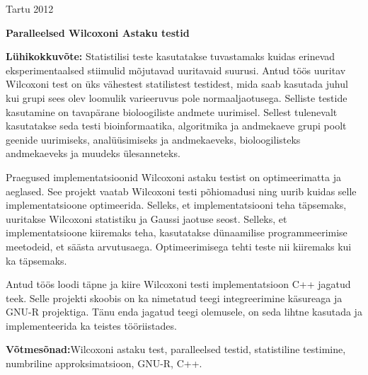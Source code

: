 \documentclass[12pt]{article}
\begin{document}
\vfill
\centerline{Tartu 2012}

\newpage
\thispagestyle{empty}
\phantom{Text to fill the page}

\newpage

\noindent\textbf{\large Paralleelsed Wilcoxoni Astaku testid}
\vspace*{3ex}

\noindent\textbf{Lühikokkuvõte:}
Statistilisi teste kasutatakse tuvastamaks kuidas erinevad eksperimentaalsed stiimulid mõjutavad uuritavaid suurusi. Antud töös uuritav Wilcoxoni test on üks vähestest statilistest testidest, mida saab kasutada juhul kui grupi sees olev loomulik varieeruvus pole normaaljaotusega. Selliste testide kasutamine on tavapärane bioloogiliste andmete uurimisel. Sellest tulenevalt kasutatakse seda testi bioinformaatika, algoritmika ja andmekaeve grupi poolt geenide uurimiseks, analüüsimiseks ja andmekaeveks, bioloogilisteks andmekaeveks ja muudeks ülesanneteks.

Praegused implementatsioonid Wilcoxoni astaku testist on optimeerimatta ja aeglased. See projekt vaatab Wilcoxoni testi põhiomadusi ning uurib kuidas selle implementatsioone optimeerida. Selleks, et implementatsiooni teha täpsemaks, uuritakse Wilcoxoni statistiku ja Gaussi jaotuse seost. Selleks, et implementatsioone kiiremaks teha, kasutatakse dünaamilise programmeerimise meetodeid, et säästa arvutusaega. Optimeerimisega tehti teste nii kiiremaks kui ka täpsemaks.

Antud töös loodi täpne ja kiire Wilcoxoni testi implementatsioon C++ jagatud teek. Selle projekti skoobis on ka nimetatud teegi integreerimine käsureaga ja GNU-R projektiga. Tänu enda jagatud teegi olemusele, on seda lihtne kasutada ja implementeerida ka teistes tööriistades.
\vspace*{3ex}

\noindent\textbf{Võtmesõnad:}{Wilcoxoni astaku test, paralleelsed testid, statistiline testimine, numbriline approksimatsioon, GNU-R, C++.}
\vspace*{6ex}
\end{document}
